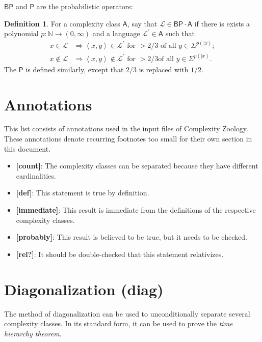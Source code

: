 \documentclass[12pt]{article}
\theoremstyle{definition}
\newtheorem{definition}[theorem]{Definition}
\theoremstyle{remark}
\newcommand{\N}{\mathbb{N}}
\newcommand{\ra}{\rightarrow}
\newcommand{\cL}{\mathcal{L}}
\newcommand{\A}{\mathsf{A}}
\newcommand{\msf}[1]{\mathsf{#1}}
\newcommand{\inner}[1]{\left\langle#1\right\rangle}
\begin{document}
$\msf{BP}$ and $\msf{P}$ are the probabilistic operators:

\begin{definition}
For a complexity class $\A$, say that $\cL\in\msf{BP}\cdot\A$ if there is
exists a polynomial $p:\N\ra(0,\infty)$ and a language $\cL^\prime\in\A$ such
that
\begin{align*}
x\in\cL&\Longrightarrow\inner{x,y}\in\cL^\prime\text{ for }>2/3\text{ of all
 }y\in\Sigma^{p(|x)}; \\
x\notin\cL&\Longrightarrow\inner{x,y}\notin\cL^\prime\text{ for }>2/3\text{
of all }y\in\Sigma^{p(|x)}.
\end{align*}
The $\msf{P}$ is defined similarly, except that $2/3$ is replaced with $1/2$.
\end{definition}

\section{Annotations}

This list consists of annotations used in the input files of Complexity
Zoology. These annotations denote recurring footnotes too small for their own
section in this document.

\begin{itemize}

\item \textbf{[count]}: The complexity classes can be separated because they
have different cardinalities.
\item \textbf{[def]}: This statement is true by definition.
\item \textbf{[immediate]}: This result is immediate from the definitions of the
respective complexity classes.
\item \textbf{[probably]}: This result is believed to be true, but it needs to
be checked.
\item \textbf{[rel?]}: It should be double-checked that this statement
relativizes.

\end{itemize}

\section{Diagonalization (diag)}

The method of diagonalization can be used to unconditionally separate several
complexity classes. In its standard form, it can be used to prove the
\textit{time hierarchy theorem}.
\end{document}
